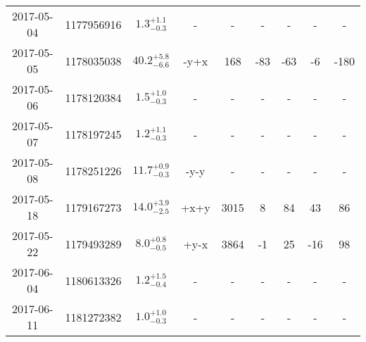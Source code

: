 \begin{longtable}{|c|c|c|c|c|c|c|c|c|}
	2017-05-04 & 1177956916 & $ 1.3^{+1.1}_{-0.3}$ & - & - & - & - & - & - \\
	2017-05-05 & 1178035038 & $40.2^{+5.8}_{-6.6}$ & -y+x & 168 & -83 & -63 & -6 & -180 \\
	2017-05-06 & 1178120384 & $ 1.5^{+1.0}_{-0.3}$ & - & - & - & - & - & - \\
	2017-05-07 & 1178197245 & $ 1.2^{+1.1}_{-0.3}$ & - & - & - & - & - & - \\
	2017-05-08 & 1178251226 & $11.7^{+0.9}_{-0.3}$ & -y-y & - & - & - & - & - \\
	2017-05-18 & 1179167273 & $14.0^{+3.9}_{-2.5}$ & +x+y & 3015 & 8 & 84 & 43 & 86 \\
	2017-05-22 & 1179493289 & $ 8.0^{+0.8}_{-0.5}$ & +y-x & 3864 & -1 & 25 & -16 & 98 \\
	2017-06-04 & 1180613326 & $ 1.2^{+1.5}_{-0.4}$ & - & - & - & - & - & - \\
	2017-06-11 & 1181272382 & $ 1.0^{+1.0}_{-0.3}$ & - & - & - & - & - & - \\
	\hline
\end{longtable} 
\endgroup